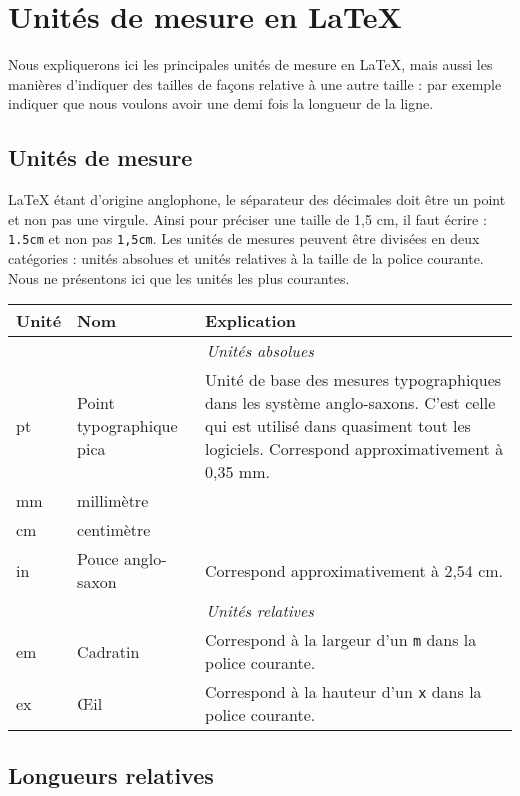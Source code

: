\chapter{Unités de mesure en \LaTeX{}}

\begin{prealable}
	Nous expliquerons ici les principales unités de mesure en \LaTeX{}, mais aussi les manières d'indiquer des tailles de façons relative à une autre taille : par exemple indiquer que nous voulons avoir une demi fois la longueur de la ligne.
\end{prealable}

\section{Unités de mesure}

\LaTeX{} étant d'origine anglophone, le séparateur des décimales doit être un point et non pas une virgule. Ainsi pour préciser une taille de 1,5 cm, il faut écrire : \verb|1.5cm| et non pas \verb|1,5cm|.
Les unités de mesures peuvent être divisées en deux catégories : unités absolues et unités relatives à la taille  de la police courante. Nous ne présentons ici que les unités les plus courantes.



\begin{longtable}{llp{15em}}
	Unité & Nom & Explication \\
	\endhead
	\multicolumn{3}{c}{\emph{Unités absolues}} \\
	pt & Point typographique pica & Unité de base des mesures typographiques dans les système anglo-saxons. C'est celle qui est utilisé dans quasiment tout les logiciels. Correspond approximativement à 0,35 mm. \\
	mm & millimètre &  \\
	cm  & centimètre & \\
	in    & Pouce anglo-saxon & Correspond approximativement à 2,54 cm. \\
	\multicolumn{3}{c}{\emph{Unités relatives}} \\
	em & Cadratin & Correspond à la largeur d'un \verb|m| dans la police courante. \\
	ex  & Œil & Correspond à la hauteur d'un \verb|x| dans la police courante. \\
\end{longtable}

\section{Longueurs relatives}

